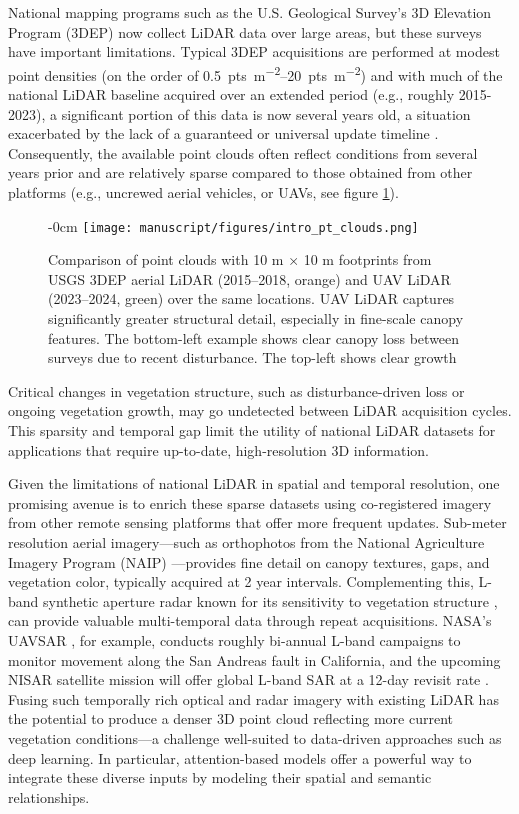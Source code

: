 \documentclass[remotesensing,article,submit,pdftex,moreauthors]{Definitions/mdpi}
\newenvironment{widefigure}[1][]{%
  \begin{figure}[#1]\begin{adjustwidth}{-\extralength}{0cm}\centering}{%
  \end{adjustwidth}\end{figure}}
\begin{document}
National mapping programs such as the U.S. Geological Survey's 3D Elevation Program (3DEP) now collect LiDAR data over large areas, but these surveys have important limitations. Typical 3DEP acquisitions are performed at modest point densities (on the order of \qtyrange{0.5}{20}{pts\per\square\meter}) \cite{wu2016evaluating} and with much of the national LiDAR baseline acquired over an extended period (e.g., roughly 2015-2023), a significant portion of this data is now several years old, a situation exacerbated by the lack of a guaranteed or universal update timeline \cite{usgs_what_2019}. Consequently, the available point clouds often reflect conditions from several years prior and are relatively sparse compared to those obtained from other platforms (e.g., uncrewed aerial vehicles, or UAVs, see figure \ref{fig:intro_pt_clouds}).
\begin{widefigure}%
    \centering
    \texttt{[image: manuscript/figures/intro\_pt\_clouds.png]}
    \caption{Comparison of point clouds with 10 m × 10 m footprints from USGS 3DEP aerial LiDAR (2015--2018, orange) and UAV LiDAR (2023--2024, green) over the same locations. UAV LiDAR captures significantly greater structural detail, especially in fine-scale canopy features. The bottom-left example shows clear canopy loss between surveys due to recent disturbance. The top-left shows clear growth }
    \label{fig:intro_pt_clouds}
\end{widefigure}
Critical changes in vegetation structure, such as disturbance-driven loss or ongoing vegetation growth, may go undetected between LiDAR acquisition cycles. This sparsity and temporal gap limit the utility of national LiDAR datasets for applications that require up-to-date, high-resolution 3D information.

Given the limitations of national LiDAR in spatial and temporal resolution, one promising avenue is to enrich these sparse datasets using co-registered imagery from other remote sensing platforms that offer more frequent updates.  Sub-meter resolution aerial imagery—such as orthophotos from the National Agriculture Imagery Program (NAIP) \cite{usda_naip_2024}—provides fine detail on canopy textures, gaps, and vegetation color, typically acquired at 2 year intervals. Complementing this, L-band synthetic aperture radar known for its sensitivity to vegetation structure \cite{wang2025interpretable}, can provide valuable multi-temporal data through repeat acquisitions. NASA’s UAVSAR \cite{rosen2006uavsar}, for example, conducts roughly bi-annual L-band campaigns to monitor movement along the San Andreas fault in California, and the upcoming NISAR satellite mission will offer global L-band SAR at a 12-day revisit rate \cite{kellogg2020nasa}. Fusing such temporally rich optical and radar imagery with existing LiDAR has the potential to produce a denser 3D point cloud reflecting more current vegetation conditions—a challenge well-suited to data-driven approaches such as deep learning. In particular, attention-based models offer a powerful way to integrate these diverse inputs by modeling their spatial and semantic relationships.
\end{document}
